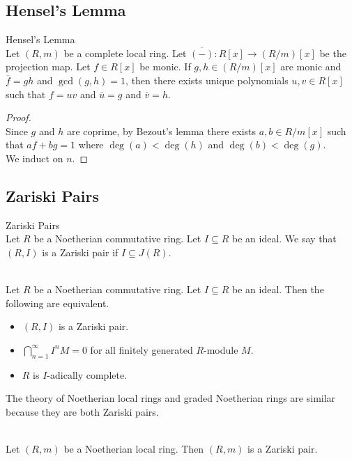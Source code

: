 \documentclass[a4paper]{article}
\begin{document}
\subsection{Hensel's Lemma}
\begin{thm}{Hensel's Lemma}{}\\
Let $(R,m)$ be a complete local ring. Let $\overline{(-)}:R[x]\to(R/m)[x]$ be the projection map. Let $f\in R[x]$ be monic. If $g,h\in(R/m)[x]$ are monic and $\overline{f}=gh$ and $\gcd(g,h)=1$, then there exists unique polynomials $u,v\in R[x]$ such that $f=uv$ and $\overline{u}=g$ and $\overline{v}=h$. 
\begin{proof}\\
Since $g$ and $h$ are coprime, by Bezout's lemma there exists $a,b\in R/m[x]$ such that $af+bg=1$ where $\deg(a)<\deg(h)$ and $\deg(b)<\deg(g)$. \\

We induct on $n$. 
\end{proof}
\end{thm}

\subsection{Zariski Pairs}
\begin{defn}{Zariski Pairs}{}\\
Let $R$ be a Noetherian commutative ring. Let $I\subseteq R$ be an ideal. We say that $(R,I)$ is a Zariski pair if $I\subseteq J(R)$. 
\end{defn}

\begin{lmm}{}{}\\
Let $R$ be a Noetherian commutative ring. Let $I\subseteq R$ be an ideal. Then the following are equivalent. 
\begin{itemize}
\item $(R,I)$ is a Zariski pair. 
\item $\bigcap_{n=1}^\infty I^nM=0$ for all finitely generated $R$-module $M$. 
\item $R$ is $I$-adically complete. 
\end{itemize}
\end{lmm}

The theory of Noetherian local rings and graded Noetherian rings are similar because they are both Zariski pairs. 

\begin{lmm}{}{}\\
Let $(R,m)$ be a Noetherian local ring. Then $(R,m)$ is a Zariski pair. 
\end{lmm}
\end{document}
